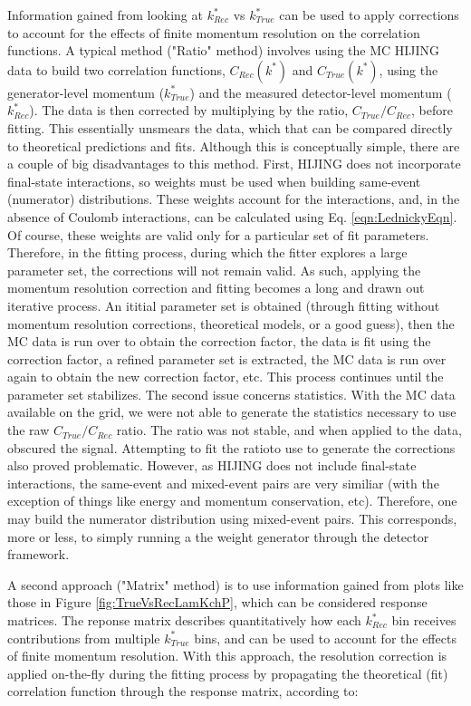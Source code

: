 \documentclass[../AnalysisNoteJBuxton.tex]{subfiles}
\begin{document}
Information gained from looking at $k^{*}_{Rec}$ vs $k^{*}_{True}$ can be used to apply corrections to account for the effects of finite momentum resolution on the correlation functions.
A typical method ("Ratio" method) involves using the MC HIJING data to build two correlation functions, $C_{Rec}(k^{*})$ and $C_{True}(k^{*})$, using the generator-level momentum ($k^{*}_{True}$) and the measured detector-level momentum ($k^{*}_{Rec}$).
The data is then corrected by multiplying by the ratio, $C_{True}/C_{Rec}$, before fitting.
This essentially unsmears the data, which that can be compared directly to theoretical predictions and fits.
Although this is conceptually simple, there are a couple of big disadvantages to this method.
First, HIJING does not incorporate final-state interactions, so weights must be used when building same-event (numerator) distributions.
These weights account for the interactions, and, in the absence of Coulomb interactions, can be calculated using Eq. \ref{eqn:LednickyEqn}.
Of course, these weights are valid only for a particular set of fit parameters.
Therefore, in the fitting process, during which the fitter explores a large parameter set, the corrections will not remain valid.
As such, applying the momentum resolution correction and fitting becomes a long and drawn out iterative process.
An ititial parameter set is obtained (through fitting without momentum resolution corrections, theoretical models, or a good guess), then the MC data is run over to obtain the correction factor, the data is fit using the correction factor, a refined parameter set is extracted, the MC data is run over again to obtain the new correction factor, etc.
This process continues until the parameter set stabilizes.
The second issue concerns statistics.
With the MC data available on the grid, we were not able to generate the statistics necessary to use the raw $C_{True}/C_{Rec}$ ratio.
The ratio was not stable, and when applied to the data, obscured the signal.
Attempting to fit the ratioto use to generate the corrections also proved problematic.
However, as HIJING does not include final-state interactions, the same-event and mixed-event pairs are very similiar (with the exception of things like energy and momentum conservation, etc).
Therefore, one may build the numerator distribution using mixed-event pairs.
This corresponds, more or less, to simply running a the weight generator through the detector framework.

A second approach ("Matrix" method) is to use information gained from plots like those in Figure \ref{fig:TrueVsRecLamKchP}, which can be considered response matrices.
The reponse matrix describes quantitatively how each $k^{*}_{Rec}$ bin receives contributions from multiple $k^{*}_{True}$ bins, and can be used to account for the effects of finite momentum resolution.
With this approach, the resolution correction is applied on-the-fly during the fitting process by propagating the theoretical (fit) correlation function through the response matrix, according to:  
\end{document}
